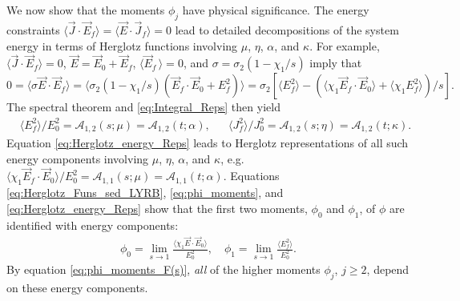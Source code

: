 \documentclass[english,12pt,jmp,graphicx]{revtex4-1}
\begin{document}
We now show that the moments $\phi_j$ have physical significance. The
energy constraints $\langle\vec{J}\cdot\vec{E}_f\rangle=\langle\vec{E}\cdot\vec{J}_f\rangle=0$ lead to
detailed decompositions of the system energy in terms of Herglotz
functions involving $\mu$, $\eta$, $\alpha$, and $\kappa$. For example,
$\langle\vec{J}\cdot\vec{E}_f\rangle=0$, $\vec{E}=\vec{E}_0+\vec{E}_f$,
$\langle\vec{E}_f\,\rangle=0$, and $\sigma=\sigma_2(1-\chi_1/s)$ imply that
$0=\langle\sigma\vec{E}\cdot\vec{E}_f\rangle=\langle\sigma_2(1-\chi_1/s)(\vec{E}_f\cdot\vec{E}_0+E_f^2)\rangle
=\sigma_2\left[\langle E_f^2\rangle- (\langle\chi_1\vec{E}_f\cdot\vec{E}_0\rangle+\langle\chi_1E_f^2\rangle)/s\right].$
The spectral theorem \cite{Reed-1980} and 
\eqref{eq:Integral_Reps} then yield
%
\begin{align}\label{eq:Herglotz_energy_Reps}
 &\langle E_f^2\rangle/E_0^2=\mathcal{A}_{1,2}(s;\mu)=\mathcal{A}_{1,2}(t;\alpha),
 &&\langle J_f^2\rangle/J_0^2=\mathcal{A}_{1,2}(s;\eta)=\mathcal{A}_{1,2}(t;\kappa).
\end{align}
%
Equation \eqref{eq:Herglotz_energy_Reps} leads to Herglotz
representations of all such energy components involving $\mu$,  
$\eta$, $\alpha$, and $\kappa$,
e.g. $\langle\chi_1\vec{E}_f\cdot\vec{E}_0\rangle/E_0^2=\mathcal{A}_{1,1}(s;\mu)=\mathcal{A}_{1,1}(t;\alpha)$. 
Equations \eqref{eq:Herglotz_Funs_sed_LYRB},
\eqref{eq:phi_moments}, and \eqref{eq:Herglotz_energy_Reps} show
that the first two moments, $\phi_0$ and $\phi_1$, of $\phi$ are identified
with energy components:      
%
\begin{align}\label{eq:phi_energy_relations}
  \phi_0=\lim_{s\to1}\frac{\langle\chi_1\vec{E}\cdot\vec{E}_0\rangle}{E_0^2},   \quad
  \phi_1=\lim_{s\to1}\frac{\langle E_f^2\rangle}{E_0^2}.
\end{align}
%
By equation \eqref{eq:phi_moments_F(s)}, \emph{all} of the higher
moments $\phi_j$, $j\geq2$, depend on these energy components. 
\end{document}
